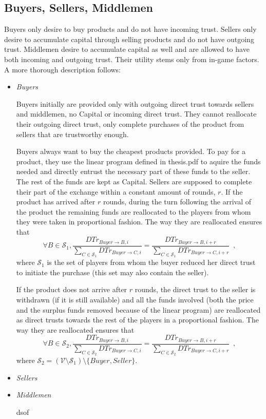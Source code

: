\subsection{Buyers, Sellers, Middlemen}
  Buyers only desire to buy products and do not have incoming trust. Sellers only desire to accumulate capital through selling
  products and do not have outgoing trust. Middlemen desire to accumulate capital as well and are allowed to have both
  incoming and outgoing trust. Their utility stems only from in-game factors. A more thorough description follows:

  \begin{itemize}
    \item \textit{Buyers}

    Buyers initially are provided only with outgoing direct trust towards sellers and middlemen, no Capital or incoming direct
    trust. They cannot reallocate their outgoing direct trust, only complete purchases of the product from sellers that are
    trustworthy enough.
    
    Buyers always want to buy the cheapest products provided. To pay for a product, they use the linear program defined in
    thesis.pdf to aquire the funds needed and directly entrust the necessary part of these funds to the seller. The rest of
    the funds are kept as Capital. Sellers are supposed to complete their part of the exchange within a constant amount of
    rounds, $r$. If the product has arrived after $r$ rounds, during the turn following the arrival of the product the
    remaining funds are reallocated to the players from whom they were taken in proportional fashion. The way they are
    reallocated ensures that
    \begin{equation*}
      \forall B \in \mathcal{S}_1, \frac{DTr_{Buyer \rightarrow B, i}}{\sum\limits_{C \in \mathcal{S}_1}DTr_{Buyer \rightarrow
      C, i}} = \frac{DTr_{Buyer \rightarrow B, i + r}}{\sum\limits_{C \in \mathcal{S}_1}DTr_{Buyer \rightarrow C, i + r}}
      \enspace,
    \end{equation*}
    where $\mathcal{S}_1$ is the set of players from whom the buyer reduced her direct trust to initiate the purchase (this
    set may also contain the seller).

    If the product does not arrive after $r$ rounds, the direct trust to the seller is withdrawn (if it is still available)
    and all the funds involved (both the price and the surplus funds removed because of the linear program) are reallocated as
    direct trusts towards the rest of the players in a proportional fashion. The way they are reallocated ensures that
    \begin{equation*}
      \forall B \in \mathcal{S}_2, \frac{DTr_{Buyer \rightarrow B, i}}{\sum\limits_{C \in \mathcal{S}_2}DTr_{Buyer \rightarrow
      C, i}} = \frac{DTr_{Buyer \rightarrow B, i + r}}{\sum\limits_{C \in \mathcal{S}_2}DTr_{Buyer \rightarrow C, i + r}}
      \enspace,
    \end{equation*}
    where $\mathcal{S}_2 = \left(\mathcal{V} \setminus \mathcal{S}_1\right) \setminus{\{Buyer, Seller\}}$.
    \item \textit{Sellers}

    \item \textit{Middlemen}

    dsof
  \end{itemize}
